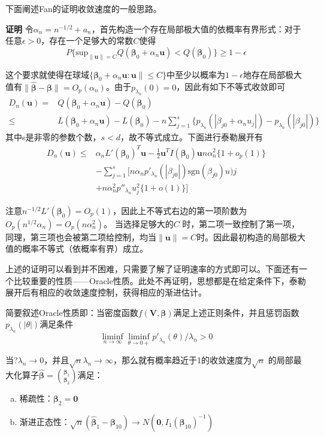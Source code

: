 ﻿\documentclass[hyperref,12pt]{ctexart}
\begin{document}
下面阐述Fan的证明收敛速度的一般思路。

\textbf{证明} 令$\alpha_n = n^{-1/2} + a_n$，首先构造一个存在局部极大值的依概率有界形式：对于任意$\epsilon > 0$，存在一个足够大的常数$C$使得
\[
P\Big\{\text{sup}_{\|\mathbf{u}\| = C} Q(\boldsymbol{\beta}_0 + \alpha_n \mathbf{u}) < Q(\boldsymbol{\beta}_0)\Big\} \geq 1 - \epsilon
\]

这个要求就使得在球域$\{\boldsymbol{\beta}_0 + \alpha_n \mathbf{u} : \mathbf{u}\| \leq C \}$中至少以概率为$1 - \epsilon$地存在局部极大值有$\| \hat{\boldsymbol{\beta}} - \boldsymbol{\beta}\| = O_p(\alpha_n)$。由于$p_{\lambda_n}(0) = 0$，因此有如下不等式收敛即可
\[
\begin{split}
D_n(\mathbf{u}) = & Q(\boldsymbol{\beta}_0 + \alpha_n \mathbf{u}) - Q(\boldsymbol{\beta}_0) \\
\leq & L(\boldsymbol{\beta}_0 + \alpha_n \mathbf{u}) - L(\boldsymbol{\beta}_0)- n\sum^s_{j = 1}\{p_{\lambda_n}(|\beta_{j0} + \alpha_n u_j|) - p_{\lambda_n}(|\beta_{j0}|)\}
\end{split}
\]
其中s是非零的参数个数，$s < d$，故不等式成立。下面进行泰勒展开有
\[
\begin{split}
D_n(\mathbf{u}) \leq & \alpha_n L'(\boldsymbol{\beta}_0)^T \mathbf{u} - \frac{1}{2}\mathbf{u}^TI(\boldsymbol{\beta}_0)\mathbf{u} n \alpha_n^2\{1 + o_p(1)\} \\
& - \sum_{j = 1}^s[n\alpha_n p'_{\lambda_n}(|\beta_{j0}|)\text{sgn}(\beta_{j0})u)j \\
& + n\alpha_n^2p''_{\lambda_n}u_j^2\{1 + o(1)\}
]
\end{split}
\]

注意$n^{-1/2}L'(\boldsymbol{\beta}_0) = O_p(1)$，因此上不等式右边的第一项阶数为$O_p(n^{1/2}\alpha_n) = O_p(n\alpha_n^2)$。 当选择足够大的$C$ 时，第二项一致控制了第一项，同理，第三项也会被第二项给控制，均当$\|\mathbf{u}\| = C$时。因此最初构造的局部极大值的概率不等式（依概率有界）成立。

上述的证明可以看到并不困难，只需要了解了证明速率的方式即可以。下面还有一个比较重要的性质——Oracle性质。此处不再证明，思想都是在给定条件下，泰勒展开后有相应的收敛速度控制，获得相应的渐进估计。

简要叙述Oracle性质即：当密度函数$f(\mathbf{V}, \boldsymbol{\beta})$满足上述正则条件，并且惩罚函数$p_{\lambda_n}(|\theta|)$满足条件
$$\liminf_{n \rightarrow \infty}\liminf_{\theta \rightarrow 0+}p'_{\lambda_n}(\theta)/ \lambda_n >0$$

当?$\lambda_n \rightarrow 0$，并且$\sqrt{n}\lambda_n \rightarrow \infty$，那么就有概率趋近于1的收敛速度为$\sqrt{n}$ 的局部最大化算子$\hat{\boldsymbol{\beta}} = \binom{\boldsymbol{\beta}_1}{\boldsymbol{\beta}_2}$满足：
\begin{enumerate}[(a)]
\item 稀疏性：$\boldsymbol{\beta}_2= \mathbf{0}$
\item 渐进正态性：$\sqrt{n}(\hat{\boldsymbol{\beta}}_1 - \boldsymbol{\beta}_{10}) \rightarrow N(\mathbf{0}, I_1(\boldsymbol{\beta}_{10})^{-1})$
\end{enumerate}
\end{document}
